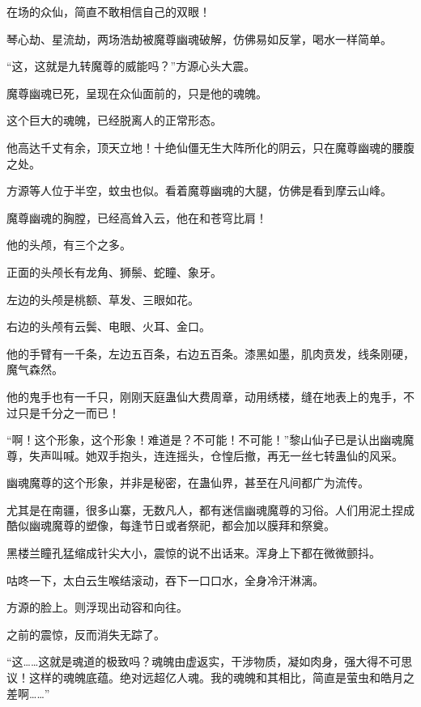
\begin{this_body}



在场的众仙，简直不敢相信自己的双眼！

琴心劫、星流劫，两场浩劫被魔尊幽魂破解，仿佛易如反掌，喝水一样简单。

“这，这就是九转魔尊的威能吗？”方源心头大震。

魔尊幽魂已死，呈现在众仙面前的，只是他的魂魄。

这个巨大的魂魄，已经脱离人的正常形态。

他高达千丈有余，顶天立地！十绝仙僵无生大阵所化的阴云，只在魔尊幽魂的腰腹之处。

方源等人位于半空，蚊虫也似。看着魔尊幽魂的大腿，仿佛是看到摩云山峰。

魔尊幽魂的胸膛，已经高耸入云，他在和苍穹比肩！

他的头颅，有三个之多。

正面的头颅长有龙角、狮鬃、蛇瞳、象牙。

左边的头颅是桃额、草发、三眼如花。

右边的头颅有云鬓、电眼、火耳、金口。

他的手臂有一千条，左边五百条，右边五百条。漆黑如墨，肌肉贲发，线条刚硬，魔气森然。

他的鬼手也有一千只，刚刚天庭蛊仙大费周章，动用绣楼，缝在地表上的鬼手，不过只是千分之一而已！

“啊！这个形象，这个形象！难道是？不可能！不可能！”黎山仙子已是认出幽魂魔尊，失声叫喊。她双手抱头，连连摇头，仓惶后撤，再无一丝七转蛊仙的风采。

幽魂魔尊的这个形象，并非是秘密，在蛊仙界，甚至在凡间都广为流传。

尤其是在南疆，很多山寨，无数凡人，都有迷信幽魂魔尊的习俗。人们用泥土捏成酷似幽魂魔尊的塑像，每逢节日或者祭祀，都会加以膜拜和祭奠。

黑楼兰瞳孔猛缩成针尖大小，震惊的说不出话来。浑身上下都在微微颤抖。

咕咚一下，太白云生喉结滚动，吞下一口口水，全身冷汗淋漓。

方源的脸上。则浮现出动容和向往。

之前的震惊，反而消失无踪了。

“这……这就是魂道的极致吗？魂魄由虚返实，干涉物质，凝如肉身，强大得不可思议！这样的魂魄底蕴。绝对远超亿人魂。我的魂魄和其相比，简直是萤虫和皓月之差啊……”


\end{this_body}
